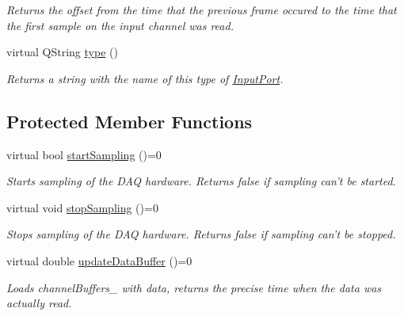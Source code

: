 \begin{DoxyCompactItemize}
\begin{DoxyCompactList}\small\item\em Returns the offset from the time that the previous frame occured to the time that the first sample on the input channel was read. \end{DoxyCompactList}\item 
\hypertarget{class_picto_1_1_input_port_a59767d320f491e862c400052c6dc6657}{virtual Q\-String \hyperlink{class_picto_1_1_input_port_a59767d320f491e862c400052c6dc6657}{type} ()}\label{class_picto_1_1_input_port_a59767d320f491e862c400052c6dc6657}

\begin{DoxyCompactList}\small\item\em Returns a string with the name of this type of \hyperlink{class_picto_1_1_input_port}{Input\-Port}. \end{DoxyCompactList}\end{DoxyCompactItemize}
\subsection*{Protected Member Functions}
\begin{DoxyCompactItemize}
\item 
\hypertarget{class_picto_1_1_input_port_aefd4ff8fcdb966e2d39c47d244ed6925}{virtual bool \hyperlink{class_picto_1_1_input_port_aefd4ff8fcdb966e2d39c47d244ed6925}{start\-Sampling} ()=0}\label{class_picto_1_1_input_port_aefd4ff8fcdb966e2d39c47d244ed6925}

\begin{DoxyCompactList}\small\item\em Starts sampling of the D\-A\-Q hardware. Returns false if sampling can't be started. \end{DoxyCompactList}\item 
\hypertarget{class_picto_1_1_input_port_a0980bd23dd8c524d3e30394539b5850f}{virtual void \hyperlink{class_picto_1_1_input_port_a0980bd23dd8c524d3e30394539b5850f}{stop\-Sampling} ()=0}\label{class_picto_1_1_input_port_a0980bd23dd8c524d3e30394539b5850f}

\begin{DoxyCompactList}\small\item\em Stops sampling of the D\-A\-Q hardware. Returns false if sampling can't be stopped. \end{DoxyCompactList}\item 
\hypertarget{class_picto_1_1_input_port_a885502b8712d339b918ac0c6ba418957}{virtual double \hyperlink{class_picto_1_1_input_port_a885502b8712d339b918ac0c6ba418957}{update\-Data\-Buffer} ()=0}\label{class_picto_1_1_input_port_a885502b8712d339b918ac0c6ba418957}

\begin{DoxyCompactList}\small\item\em Loads channel\-Buffers\-\_\- with data, returns the precise time when the data was actually read. \end{DoxyCompactList}\end{DoxyCompactItemize}
